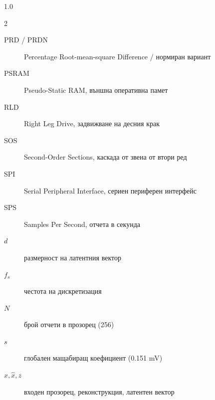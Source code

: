 \documentclass[12pt,a4paper]{article}
\begin{document}
\begin{spacing}{1.0}
\begin{multicols}{2}
\begin{description}
    \item[PRD / PRDN] Percentage Root-mean-square Difference / нормиран вариант
    \item[PSRAM] Pseudo-Static RAM, външна оперативна памет
    \item[RLD] Right Leg Drive, задвижване на десния крак
    \item[SOS] Second-Order Sections, каскада от звена от втори ред
    \item[SPI] Serial Peripheral Interface, сериен периферен интерфейс
    \item[SPS] Samples Per Second, отчета в секунда
    \item[\(d\)] размерност на латентния вектор
    \item[\(f_s\)] честота на дискретизация
    \item[\(N\)] брой отчети в прозорец (256)
    \item[\(s\)] глобален мащабиращ коефициент (0.151 mV)
    \item[\(x, \hat{x}, z\)] входен прозорец, реконструкция, латентен вектор
\end{description}
\end{multicols}
\end{spacing}
\end{document}
